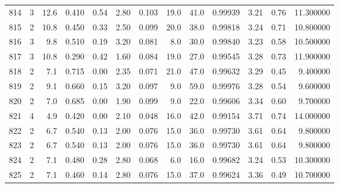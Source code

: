 \begin{tabular}{lrrrrrrrrrrrr}
814  &        3 &           12.6 &             0.410 &         0.54 &            2.80 &      0.103 &                 19.0 &                  41.0 &  0.99939 &  3.21 &       0.76 &  11.300000 \\
815  &        2 &           10.8 &             0.450 &         0.33 &            2.50 &      0.099 &                 20.0 &                  38.0 &  0.99818 &  3.24 &       0.71 &  10.800000 \\
816  &        3 &            9.8 &             0.510 &         0.19 &            3.20 &      0.081 &                  8.0 &                  30.0 &  0.99840 &  3.23 &       0.58 &  10.500000 \\
817  &        3 &           10.8 &             0.290 &         0.42 &            1.60 &      0.084 &                 19.0 &                  27.0 &  0.99545 &  3.28 &       0.73 &  11.900000 \\
818  &        2 &            7.1 &             0.715 &         0.00 &            2.35 &      0.071 &                 21.0 &                  47.0 &  0.99632 &  3.29 &       0.45 &   9.400000 \\
819  &        2 &            9.1 &             0.660 &         0.15 &            3.20 &      0.097 &                  9.0 &                  59.0 &  0.99976 &  3.28 &       0.54 &   9.600000 \\
820  &        2 &            7.0 &             0.685 &         0.00 &            1.90 &      0.099 &                  9.0 &                  22.0 &  0.99606 &  3.34 &       0.60 &   9.700000 \\
821  &        4 &            4.9 &             0.420 &         0.00 &            2.10 &      0.048 &                 16.0 &                  42.0 &  0.99154 &  3.71 &       0.74 &  14.000000 \\
822  &        2 &            6.7 &             0.540 &         0.13 &            2.00 &      0.076 &                 15.0 &                  36.0 &  0.99730 &  3.61 &       0.64 &   9.800000 \\
823  &        2 &            6.7 &             0.540 &         0.13 &            2.00 &      0.076 &                 15.0 &                  36.0 &  0.99730 &  3.61 &       0.64 &   9.800000 \\
824  &        2 &            7.1 &             0.480 &         0.28 &            2.80 &      0.068 &                  6.0 &                  16.0 &  0.99682 &  3.24 &       0.53 &  10.300000 \\
825  &        2 &            7.1 &             0.460 &         0.14 &            2.80 &      0.076 &                 15.0 &                  37.0 &  0.99624 &  3.36 &       0.49 &  10.700000 \\

\end{tabular}
